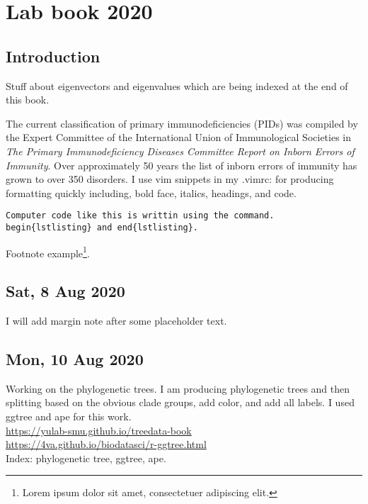 \pagestyle{myheadings}

\chapter{Lab book 2020}

\section{Introduction}
Stuff about eigenvectors and
eigenvalues which are being  indexed at the end of this book. 

The current classification of primary immunodeficiencies (PIDs) was compiled by the Expert Committee of the International Union of Immunological Societies
\citep{picard2018international}
in \textit{The Primary Immunodeficiency Diseases Committee Report on Inborn Errors of Immunity}.
Over approximately 50 years the list of inborn errors of immunity has grown to over 350 disorders.
I use vim snippets in my .vimrc: for producing formatting quickly including, bold face, italics, headings, and code.

\begin{lstlisting}
Computer code like this is writtin using the command. begin{lstlisting} and end{lstlisting}.
\end{lstlisting}
Footnote example\footnote{Lorem ipsum dolor sit amet, consectetuer adipiscing elit.}.\\

\section{Sat, 8 Aug 2020 \projectA{} } 
I will add margin note after some placeholder text.
\lipsum[2-3]


\section{Mon, 10 Aug 2020 \projectB{}}
Working on the phylogenetic trees. 
I am producing phylogenetic trees and then splitting based on the obvious clade groups, add color, and add all labels. 
I used ggtree and ape for this work.\\
\url{ https://yulab-smu.github.io/treedata-book} \\
\url{https://4va.github.io/biodatasci/r-ggtree.html}\\
Index: phylogenetic tree, ggtree, ape.

